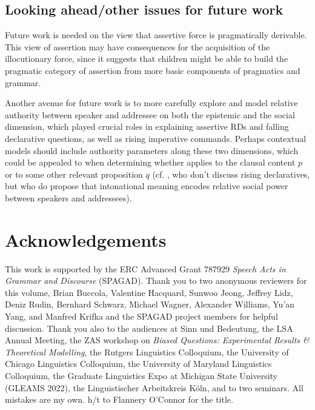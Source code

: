\documentclass[output=paper,colorlinks,citecolor=brown]{langscibook}
\begin{document}
	
\subsection{Looking ahead/other issues for future work} \label{openIss}
	
	
	Future work is needed on the view that assertive force is pragmatically derivable. This view of assertion may have consequences for the acquisition of the illocutionary force, since it suggests that children might be able to build the pragmatic category of assertion from more basic components of pragmatics and grammar. 
	
	Another avenue for future work is to more carefully explore and model relative authority between speaker and addressee on both the epistemic and the social dimension, which played crucial roles in explaining assertive RDs and falling declarative questions, as well as rising imperative commands. Perhaps contextual models should include authority parameters along these two dimensions, which could be appealed to when determining whether \rise applies to the clausal content $p$ or to some other relevant proposition $q$ (cf. \citealt{merin97}, who don't discuss rising declaratives, but who do propose that intonational meaning encodes relative social power between speakers and addressees).

\section{Acknowledgements}
This work is supported by the ERC Advanced Grant 787929 \textit{Speech Acts in Grammar and Discourse} (SPAGAD). Thank you to two anonymous reviewers for this volume, Brian Buccola, Valentine Hacquard, Sunwoo Jeong, Jeffrey Lidz, Deniz Rudin, Bernhard Schwarz, Michael Wagner, Alexander Williams, Yu'an Yang, and Manfred Krifka and the SPAGAD project members for helpful discussion. Thank you also to the audiences at Sinn und Bedeutung, the LSA Annual Meeting, the ZAS workshop on \textit{Biased Questions: Experimental Results \& Theoretical Modelling}, the Rutgers Linguistics Colloquium, the University of Chicago Linguistics Colloquium, the University of Maryland Linguistics Colloquium, the Graduate Linguistics Expo at Michigan State University (GLEAMS 2022), the Linguistischer Arbeitskreis K\"oln, and to two seminars. All mistakes are my own. h/t to Flannery O'Connor for the title.

\printbibliography[heading=subbibliography,notkeyword=this]
	
\end{document}
